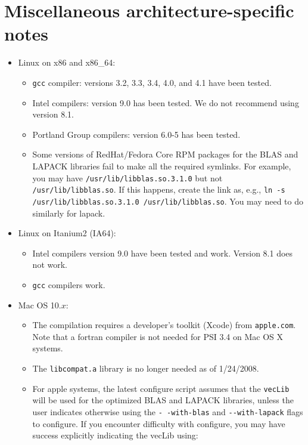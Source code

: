 \documentclass[12pt]{article}
\begin{document}
\section{Miscellaneous architecture-specific notes}
\begin{itemize}

\item Linux on x86 and x86\_64:
  \begin{itemize}
   \item {\tt gcc} compiler: versions 3.2, 3.3, 3.4, 4.0, and 4.1 have been tested.
   \item Intel compilers: version 9.0 has been tested. We do not recommend
   using version 8.1.
   \item Portland Group compilers: version 6.0-5 has been tested.
   \item Some versions of RedHat/Fedora Core RPM packages for the 
   BLAS and LAPACK libraries fail to make all the required symlinks.  
   For example, you may have {\tt /usr/lib/libblas.so.3.1.0} but not
   {\tt /usr/lib/libblas.so}.  If this happens, create the link as, e.g.,
   {\tt ln -s /usr/lib/libblas.so.3.1.0 /usr/lib/libblas.so}.  You
   may need to do similarly for lapack.
  \end{itemize}

\item Linux on Itanium2 (IA64):
  \begin{itemize}
   \item Intel compilers version 9.0 have been tested and work. Version 8.1
   does not work.
   \item {\tt gcc} compilers work.
  \end{itemize}

\item Mac OS 10.$x$:

  \begin{itemize}
  \item The compilation requires a developer's toolkit (Xcode) from
    {\tt apple.com}.  Note that a fortran compiler is not needed for
    PSI 3.4 on Mac OS X systems.

  \item The {\tt libcompat.a} library is no longer needed as of 1/24/2008.

  \item For apple systems, the latest configure script assumes that the
  {\tt vecLib} will be used for the optimized BLAS and LAPACK
  libraries, unless the user indicates otherwise using the {\tt -}{\tt
    -with-blas} and {\tt -}{\tt -with-lapack} flags to configure.  If
  you encounter difficulty with configure, you may have success
  explicitly indicating the vecLib using:


\end{itemize}
\end{itemize}
\end{document}
